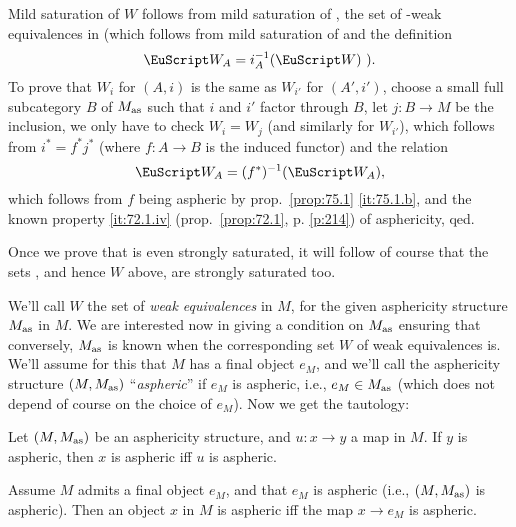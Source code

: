 Mild saturation of $W$ follows from mild saturation of \scrWA, the set
of \scrW-weak equivalences in \Ahat{} (which follows from mild
saturation of \scrW{} and the definition
\[ \text{$\scrWA=i_A^{-1}(\scrW)$ ).}\]
To prove that $W_i$ for $(A,i)$ is the same as $W_{i'}$ for $(A',i')$,
choose a small full subcategory $B$ of $M_{\mathrm{as}}$ such that $i$ and
$i'$ factor through $B$, let $j:B\to M$ be the inclusion, we only have
to check $W_i=W_j$ (and similarly for $W_{i'}$), which follows from
$i^*=f^*j^*$ (where $f:A\to B$ is the induced functor) and the
relation
\[\scrWA = (f^*)^{-1}(\scrWA),\]
which follows from $f$ being aspheric by prop.\ \ref{prop:75.1}
\ref{it:75.1.b}, and the known property \ref{it:72.1.iv} (prop.\
\ref{prop:72.1}, p. \ref{p:214}) of asphericity, qed.
\begin{remark}
  Once we prove that \scrW{} is even strongly saturated, it will
  follow of course that the sets \scrWA, and hence $W$ above, are
  strongly saturated too.
\end{remark}

We'll call $W$ the set of \emph{weak equivalences} in $M$, for the
given asphericity structure $M_{\mathrm{as}}$ in $M$. We are interested now in
giving a condition on $M_{\mathrm{as}}$ ensuring that conversely, $M_{\mathrm{as}}$ is
known when the corresponding set $W$ of weak equivalences is. We'll
assume for this that $M$ has a final object $e_M$, and we'll call the
asphericity structure $(M,M_{\mathrm{as}})$ ``\emph{aspheric}'' if $e_M$ is
aspheric, i.e., $e_M\in M_{\mathrm{as}}$ (which does not depend of course on
the choice of $e_M$). Now we get the tautology:
\begin{propositionnum}\label{prop:75.3}
  Let $(M,M_{\mathrm{as}})$ be an asphericity structure, and $u:x\to y$ a map
  in $M$. If $y$ is aspheric, then $x$ is aspheric if{f} $u$ is
  aspheric.
\end{propositionnum}
\begin{corollary}
  Assume $M$ admits a final object $e_M$, and that $e_M$ is aspheric
  \textup(i.e., $(M,M_{\mathrm{as}})$ is aspheric\textup). Then an object $x$
  in $M$ is aspheric if{f} the map $x\to e_M$ is aspheric.
\end{corollary}

